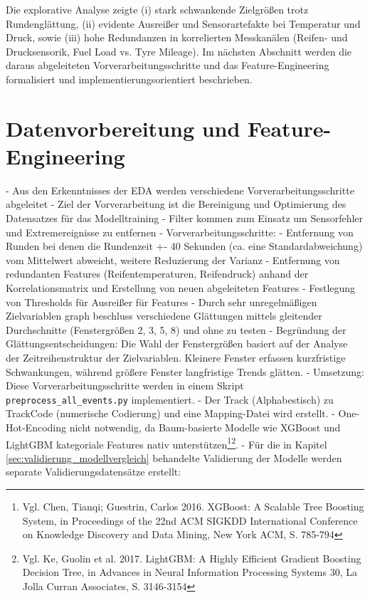 Die explorative Analyse zeigte (i) stark schwankende Zielgrößen trotz Rundenglättung, (ii) evidente Ausreißer und Sensorartefakte bei Temperatur und Druck, sowie (iii) hohe Redundanzen in korrelierten Messkanälen (Reifen- und Drucksensorik, Fuel Load vs. Tyre Mileage). Im nächsten Abschnitt werden die daraus abgeleiteten Vorverarbeitungsschritte und das Feature-Engineering formalisiert und implementierungsorientiert beschrieben.



\section{Datenvorbereitung und Feature-Engineering}

- Aus den Erkenntnisses der EDA werden verschiedene Vorverarbeitungsschritte abgeleitet
- Ziel der Vorverarbeitung ist die Bereinigung und Optimierung des Datensatzes für das Modelltraining
- Filter kommen zum Einsatz um Sensorfehler und Extremereignisse zu entfernen
- Vorverarbeitungsschritte:
- Entfernung von Runden bei denen die Rundenzeit +- 40 Sekunden (ca. eine Standardabweichung) vom Mittelwert abweicht, weitere Reduzierung der Varianz
- Entfernung von redundanten Features (Reifentemperaturen, Reifendruck) anhand der Korrelationsmatrix und Erstellung von neuen abgeleiteten Features
- Festlegung von Thresholds für Ausreißer für Features
- Durch sehr unregelmäßigen Zielvariablen graph beschluss verschiedene Glättungen mittels gleitender Durchschnitte (Fenstergrößen 2, 3, 5, 8) und ohne zu testen
- Begründung der Glättungsentscheidungen: Die Wahl der Fenstergrößen basiert auf der Analyse der Zeitreihenstruktur der Zielvariablen. Kleinere Fenster erfassen kurzfristige Schwankungen, während größere Fenster langfristige Trends glätten.
- Umsetzung: Diese Vorverarbeitungsschritte werden in einem Skript \texttt{preprocess\_all\_events.py} implementiert.
- Der Track (Alphabestisch) zu TrackCode (numerische Codierung) und eine Mapping-Datei wird erstellt.
- One-Hot-Encoding nicht notwendig, da Baum-basierte Modelle wie XGBoost und LightGBM kategoriale Features nativ unterstützen\footnote{Vgl. Chen, Tianqi; Guestrin, Carlos 2016. XGBoost: A Scalable Tree Boosting System, in Proceedings of the 22nd ACM SIGKDD International Conference on Knowledge Discovery and Data Mining, New York ACM, S. 785-794}\footnote{Vgl. Ke, Guolin et al. 2017. LightGBM: A Highly Efficient Gradient Boosting Decision Tree, in Advances in Neural Information Processing Systems 30, La Jolla Curran Associates, S. 3146-3154}.
- Für die in Kapitel \ref{sec:validierung_modellvergleich} behandelte Validierung der Modelle werden separate Validierungsdatensätze erstellt:
